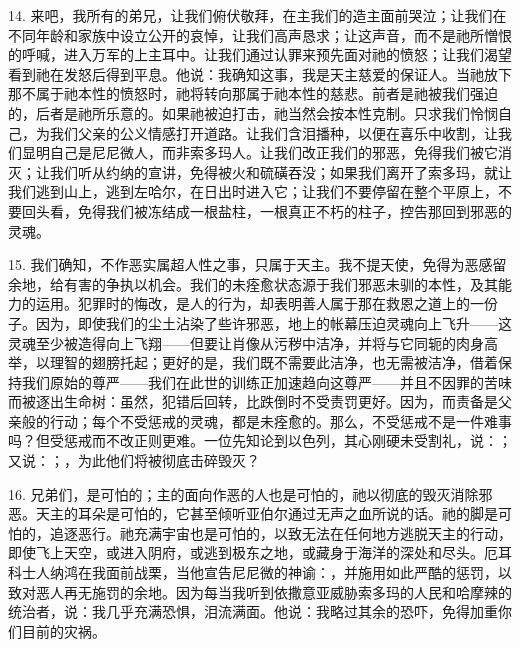 14. 来吧，我所有的弟兄，让我们俯伏敬拜，在主我们的造主面前哭泣；让我们在不同年龄和家族中设立公开的哀悼，让我们高声恳求；让这声音，而不是祂所憎恨的呼喊，进入万军的上主耳中。让我们通过认罪来预先面对祂的愤怒；让我们渴望看到祂在发怒后得到平息。他说：我确知这事，我是天主慈爱的保证人。当祂放下那不属于祂本性的愤怒时，祂将转向那属于祂本性的慈悲。前者是祂被我们强迫的，后者是祂所乐意的。如果祂被迫打击，祂当然会按本性克制。只求我们怜悯自己，为我们父亲的公义情感打开道路。让我们含泪播种，以便在喜乐中收割，让我们显明自己是尼尼微人，而非索多玛人。让我们改正我们的邪恶，免得我们被它消灭；让我们听从约纳的宣讲，免得被火和硫磺吞没；如果我们离开了索多玛，就让我们逃到山上，逃到左哈尔，在日出时进入它；让我们不要停留在整个平原上，不要回头看，免得我们被冻结成一根盐柱，一根真正不朽的柱子，控告那回到邪恶的灵魂。\par

15. 我们确知，不作恶实属超人性之事，只属于天主。我不提天使，免得为恶感留余地，给有害的争执以机会。我们的未痊愈状态源于我们邪恶未驯的本性，及其能力的运用。犯罪时的悔改，是人的行为，却表明善人属于那在救恩之道上的一份子。因为，即使我们的尘土沾染了些许邪恶，地上的帐幕压迫灵魂向上飞升——这灵魂至少被造得向上飞翔——但要让肖像从污秽中洁净，并将与它同轭的肉身高举，以理智的翅膀托起；更好的是，我们既不需要此洁净，也无需被洁净，借着保持我们原始的尊严——我们在此世的训练正加速趋向这尊严——并且不因罪的苦味而被逐出生命树：虽然，犯错后回转，比跌倒时不受责罚更好。因为，而责备是父亲般的行动；每个不受惩戒的灵魂，都是未痊愈的。那么，不受惩戒不是一件难事吗？但受惩戒而不改正则更难。一位先知论到以色列，其心刚硬未受割礼，说：；又说：；，为此他们将被彻底击碎毁灭？\par

16. 兄弟们，是可怕的；主的面向作恶的人也是可怕的，祂以彻底的毁灭消除邪恶。天主的耳朵是可怕的，它甚至倾听亚伯尔通过无声之血所说的话。祂的脚是可怕的，追逐恶行。祂充满宇宙也是可怕的，以致无法在任何地方逃脱天主的行动，即使飞上天空，或进入阴府，或逃到极东之地，或藏身于海洋的深处和尽头。厄耳科士人纳鸿在我面前战栗，当他宣告尼尼微的神谕：，并施用如此严酷的惩罚，以致对恶人再无施罚的余地。因为每当我听到依撒意亚威胁索多玛的人民和哈摩辣的统治者，说：我几乎充满恐惧，泪流满面。他说：我略过其余的恐吓，免得加重你们目前的灾祸。\par


